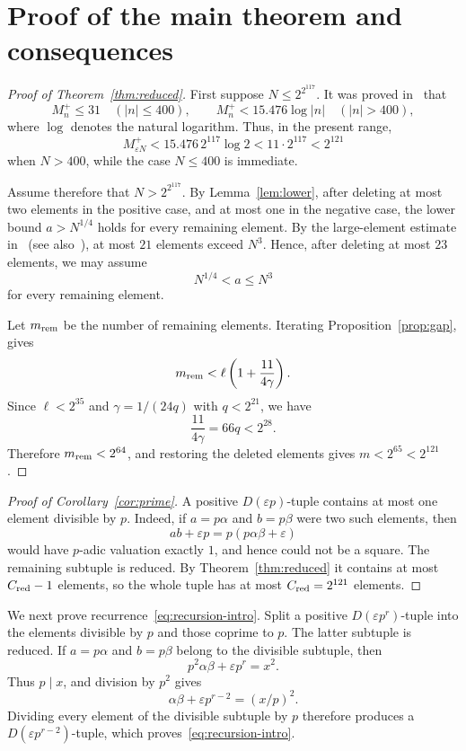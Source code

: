 \documentclass[11pt]{amsart}
\theoremstyle{remark}
\newcommand{\eps}{\varepsilon}
\begin{document}
\section{Proof of the main theorem and consequences}

\begin{proof}[Proof of Theorem~\ref{thm:reduced}]
First suppose $N\le2^{2^{117}}$. It was proved in~\cite{DujellaBounds} that
\[
 M_n^+\le31\quad(|n|\le400),
 \qquad
 M_n^+<15.476\log|n|\quad(|n|>400),
\]
where $\log$ denotes the natural logarithm. Thus, in the present
range,
\[
 M_{\eps N}^+<15.476\,2^{117}\log2
 <11\cdot2^{117}<2^{121}
\]
when $N>400$, while the case $N\le400$ is immediate.

Assume therefore that $N > 2^{2^{117}}$. By Lemma~\ref{lem:lower}, after deleting
at most two elements in the positive case, and at most one in the negative
case, the lower bound $a>N^{1/4}$ holds for every remaining element. By the
large-element estimate in~\cite{Dcamb} (see also~\cite[Proposition~5.2.1]{Dbook}), at most $21$
elements exceed $N^3$. Hence, after deleting at most $23$ elements, we may
assume
\[
 N^{1/4}<a\le N^3
\]
for every remaining element.

Let $m_{\rm rem}$ be the number of remaining elements. Iterating
Proposition~\ref{prop:gap}, gives
\[
 m_{\rm rem}<\ell\left(1+\frac{11}{4\gamma}\right).
\]
Since $\ell<2^{35}$ and $\gamma=1/(24q)$ with $q<2^{21}$, we have
\[
 \frac{11}{4\gamma}=66q<2^{28}.
\]
Therefore $m_{\rm rem}<2^{64}$, and restoring the deleted elements gives
$m<2^{65}<2^{121}$.
\end{proof}

\begin{proof}[Proof of Corollary~\ref{cor:prime}]
A positive $D(\eps p)$-tuple contains at most one element divisible by $p$.
Indeed, if $a=p\alpha$ and $b=p\beta$ were two such elements, then
\[
 ab+\eps p=p(p\alpha\beta+\eps)
\]
would have $p$-adic valuation exactly $1$, and hence could not be a square.
The remaining subtuple is reduced. By Theorem~\ref{thm:reduced} it contains
at most $C_{\rm red}-1$ elements, so the whole tuple has at most
$C_{\rm red}=2^{121}$ elements.
\end{proof}

We next prove recurrence~\eqref{eq:recursion-intro}. Split a positive
$D(\eps p^r)$-tuple into the elements divisible by $p$ and those coprime to
$p$. The latter subtuple is reduced. If $a=p\alpha$ and $b=p\beta$ belong
to the divisible subtuple, then
\[
 p^2\alpha\beta+\eps p^r=x^2.
\]
Thus $p\mid x$, and division by $p^2$ gives
\[
 \alpha\beta+\eps p^{r-2}=(x/p)^2.
\]
Dividing every element of the divisible subtuple by $p$ therefore produces
a $D(\eps p^{r-2})$-tuple, which proves~\eqref{eq:recursion-intro}.
\end{document}
